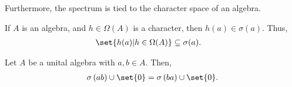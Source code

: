 Furthermore, the spectrum is tied to the character space of an algebra.
\begin{corollary}\label{cor:characters_algebras}
  If $A$ is an algebra, and $h\in \Omega\left( A \right)$ is a character, then $h(a)\in \sigma\left( a \right)$. Thus,
  \begin{align*}
    \set{h(a) | h\in \Omega(A)} &\subseteq \sigma(a).
  \end{align*}
\end{corollary}
\begin{fact}\label{fact:spectrum_commutative}
  Let $A$ be a unital algebra with $a,b\in A$. Then,
  \begin{align*}
    \sigma\left( ab \right)\cup \set{0} = \sigma\left( ba \right)\cup \set{0}.
  \end{align*}
\end{fact}

